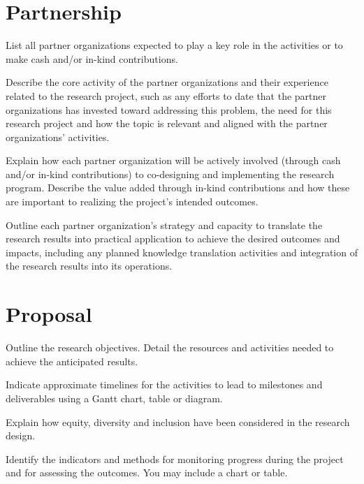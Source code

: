 \documentclass[english]{nserc-alliance}
\begin{document}
\section*{Partnership}
\ifinst\begin{instructions}
\item List all partner organizations expected to play a key role in the activities or to make cash and/or in-kind contributions.
\item Describe the core activity of the partner organizations and their experience related to the research project, such as any efforts to date that the partner organizations has invested toward addressing this problem, the need for this research project and how the topic is relevant and aligned with the partner organizations’ activities.
\item Explain how each partner organization will be actively involved (through cash and/or in-kind contributions) to co-designing and implementing the research program. Describe the value added through in-kind contributions and how these are important to realizing the project’s intended outcomes.
\item Outline each partner organization’s strategy and capacity to translate the research results into practical application to achieve the desired outcomes and impacts, including any planned knowledge translation activities and integration of the research results into its operations.
\end{instructions}\fi


\section*{Proposal}
\ifinst\begin{instructions}
\item Outline the research objectives. Detail the resources and activities needed to achieve the anticipated results.
\item Indicate approximate timelines for the activities to lead to milestones and deliverables using a Gantt chart, table or diagram.
\item Explain how equity, diversity and inclusion have been considered in the research design.
\item Identify the indicators and methods for monitoring progress during the project and for assessing the outcomes. You may include a chart or table.
\end{instructions}\fi
\end{document}
